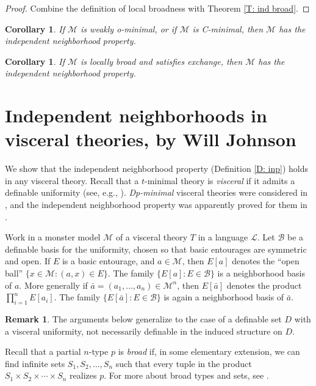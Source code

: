 \documentclass{amsart}
\newtheorem{corollary}[theorem]{Corollary}
\theoremstyle{definition}
\newtheorem{remark}[theorem]{Remark}
\begin{document}
\begin{proof}
    Combine the definition of local broadness with Theorem \ref{T: ind broad}.
\end{proof}

\begin{corollary}
    If $\mathcal M$ is weakly o-minimal, or if $\mathcal M$ is C-minimal, then $\mathcal M$ has the independent neighborhood property.
\end{corollary}

\begin{corollary}
    If $\mathcal M$ is locally broad and satisfies exchange, then $\mathcal M$ has the independent neighborhood property.
\end{corollary}


\section{Independent neighborhoods in visceral theories, by Will Johnson}\label{A: visceral}
We show that the independent neighborhood property (Definition \ref{D: inp}) holds in any visceral theory. Recall that a $t$-minimal theory is \textit{visceral} if it admits a definable uniformity (see, e.g., \cite[Definition 1.17]{t-minimal-johnson}). \emph{Dp-minimal} visceral theories were considered in \cite{SimWal}, and the independent neighborhood property was apparently proved for them in \cite[Corollary 3.12]{HaHaPeGps}. 

Work in a monster model $\mathcal{M}$ of a visceral theory $T$ in a language $\mathcal{L}$.  Let $\mathcal{B}$
be a definable basis for the uniformity, chosen so that basic
entourages are symmetric and open.  If $E$ is a basic entourage, and
$a \in \mathcal{M}$, then $E[a]$ denotes the ``open ball'' $\{x \in \mathcal{M} :
(a,x) \in E\}$.  The family $\{E[a] : E \in \mathcal{B}\}$ is a
neighborhood basis of $a$.  More generally if $\bar{a} = (a_1,\ldots,a_n) \in \mathcal{M}^n$, then $E[\bar{a}]$ denotes the product $\prod_{i=1}^n E[a_i]$.  The family $\{E[\bar{a}] : E \in \mathcal{B}\}$ is again a neighborhood basis of $\bar{a}$.
\begin{remark}
  The arguments below generalize to the case of a definable set $D$
  with a visceral uniformity, not necessarily definable in the induced
  structure on $D$.
\end{remark}
Recall that a partial $n$-type $p$ is \emph{broad} if, in some elementary extension, we can find infinite sets $S_1,S_2,\ldots,S_n$ such that every tuple in the product $S_1 \times S_2 \times \cdots \times S_n$ realizes $p$.  For more about broad types and sets, see \cite[\S 2.1]{t-minimal-johnson}.
\end{document}
